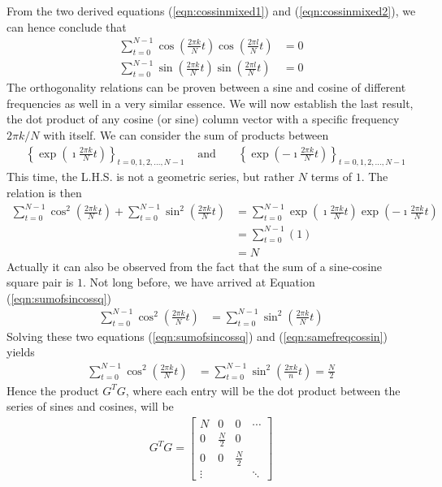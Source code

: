 From the two derived equations (\ref{eqn:cossinmixed1}) and (\ref{eqn:cossinmixed2}), we can hence conclude that
\begin{align*}
\sum_{t=0}^{N-1} \cos(\frac{2\pi k}{N} t)\cos(\frac{2\pi l}{N} t) &= 0 \\
\sum_{t=0}^{N-1} \sin(\frac{2\pi k}{N} t)\sin(\frac{2\pi l}{N} t) &= 0        
\end{align*}
The orthogonality relations can be proven between a sine and cosine of different frequencies as well in a very similar essence. We will now establish the last result, the dot product of any cosine (or sine) column vector with a specific frequency $2\pi k/N$ with itself. We can consider the sum of products between
\begin{align*}
&\left\{\exp(\imath \frac{2\pi k}{N} t)\right\}_{t = 0,1,2,\ldots,N-1} & \text{ and } & &\left\{\exp(-\imath \frac{2\pi k}{N} t)\right\}_{t = 0,1,2,\ldots,N-1}
\end{align*} 
This time, the L.H.S. is not a geometric series, but rather $N$ terms of $1$. The relation is then
\begin{align}
\sum_{t=0}^{N-1} \cos^2(\frac{2\pi k}{N} t) + \sum_{t=0}^{N-1} \sin^2(\frac{2\pi k}{N} t) &= \sum_{t=0}^{N-1} \exp(\imath \frac{2\pi k}{N} t)\exp(-\imath \frac{2\pi k}{N} t) \nonumber \\
&= \sum_{t=0}^{N-1} (1) \nonumber \\
&= N \label{eqn:samefreqcossin}
\end{align}
Actually it can also be observed from the fact that the sum of a sine-cosine square pair is $1$. Not long before, we have arrived at Equation (\ref{eqn:sumofsincossq})
\begin{align*}
\sum_{t=0}^{N-1} \cos^2(\frac{2\pi k}{N} t) &= \sum_{t=0}^{N-1} \sin^2(\frac{2\pi k}{N} t)     
\end{align*}
Solving these two equations (\ref{eqn:sumofsincossq}) and (\ref{eqn:samefreqcossin}) yields
\begin{align}
\sum_{t=0}^{N-1} \cos^2(\frac{2\pi k}{N} t) &= \sum_{t=0}^{N-1} \sin^2(\frac{2\pi k}{n} t) = \frac{N}{2} \label{eqn:sqcossineNhalf}   
\end{align}
Hence the product $G^TG$, where each entry will be the dot product between the series of sines and cosines, will be
\begin{align*}
G^TG =
\begin{bmatrix}
N & 0 & 0 & \cdots \\
0 & \frac{N}{2} & 0 & \\
0 & 0 & \frac{N}{2} & \\
\vdots & & & \ddots
\end{bmatrix}
\end{align*}
